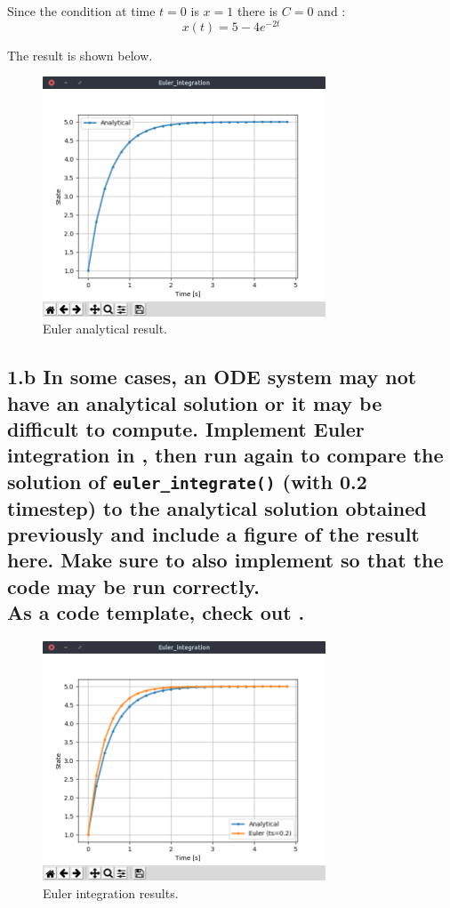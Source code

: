 \documentclass{cmc}
\begin{document}
Since the condition at time $t = 0$ is $x=1$ there is $C=0$ and :
$$x(t) = 5 - 4e^{-2t}$$

The result is shown below.

\begin{figure}[H]
  \centering
  \includegraphics[width=0.75\textwidth,trim={0 1.25cm 0 0},clip]{figures/ex1_euler_analytical.png}
  \caption{Euler analytical result.}
  \label{fig:euler_analytical}
\end{figure}

\subsection*{1.b In some cases, an ODE system may not have an analytical
  solution or it may be difficult to compute. Implement Euler integration in
  , %
  then run  again to compare the solution of
  \texttt{eu\-ler\_integr\-ate()} (with 0.2 timestep) %
  to the analytical solution obtained previously and include a figure of the
  result here. Make sure to also implement
  so that the code may be run correctly. \\ As a code template, check out
  .}

\begin{figure}[H]
  \centering
  \includegraphics[width=0.75\textwidth,trim={0 1.25cm 0 0},clip]{figures/ex1_euler_integration.png}
  \caption{Euler integration results.}
  \label{fig:euler_integration}
\end{figure}
\end{document}
